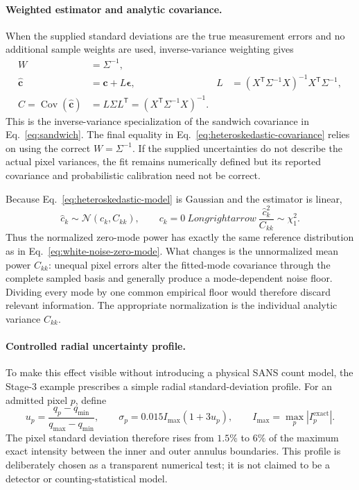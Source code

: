 \documentclass[aps,prb,preprint,onecolumn,notitlepage,amsmath,amssymb,
  superscriptaddress,floatfix]{revtex4-2}
\newcommand{\trans}{\mathsf{T}}
\begin{document}
\paragraph{Weighted estimator and analytic covariance.}
When the supplied standard deviations are the true measurement errors and no
additional sample weights are used, inverse-variance weighting gives
\begin{align}
 W&=\Sigma^{-1},\nonumber\\
 \widehat{\bm c}
 &=\bm c+L\bm\epsilon,
 &L&=(X^{\trans}\Sigma^{-1}X)^{-1}X^{\trans}\Sigma^{-1},
 \label{eq:heteroskedastic-response}\\
 C=\operatorname{Cov}(\widehat{\bm c})
 &=L\Sigma L^{\trans}
 =(X^{\trans}\Sigma^{-1}X)^{-1}.
 \label{eq:heteroskedastic-covariance}
\end{align}
This is the inverse-variance specialization of the sandwich covariance in
Eq.~\eqref{eq:sandwich}.  The final equality in
Eq.~\eqref{eq:heteroskedastic-covariance} relies on using the correct
$W=\Sigma^{-1}$.  If the supplied uncertainties do not describe the actual
pixel variances, the fit remains numerically defined but its reported
covariance and probabilistic calibration need not be correct.

Because Eq.~\eqref{eq:heteroskedastic-model} is Gaussian and the estimator is
linear,
\begin{equation}
 \widehat c_k\sim\mathcal{N}(c_k,C_{kk}),
 \qquad
 c_k=0\ Longrightarrow\
 \frac{\widehat c_k^2}{C_{kk}}\sim\chi_1^2.
 \label{eq:heteroskedastic-zero-mode}
\end{equation}
Thus the normalized zero-mode power has exactly the same reference
distribution as in Eq.~\eqref{eq:white-noise-zero-mode}.  What changes is the
unnormalized mean power $C_{kk}$: unequal pixel errors alter the fitted-mode
covariance through the complete sampled basis and generally produce a
mode-dependent noise floor.  Dividing every mode by one common empirical
floor would therefore discard relevant information.  The appropriate
normalization is the individual analytic variance $C_{kk}$.

\paragraph{Controlled radial uncertainty profile.}
To make this effect visible without introducing a physical SANS count model,
the Stage-3 example prescribes a simple radial standard-deviation profile.
For an admitted pixel $p$, define
\begin{equation}
 u_p=\frac{q_p-q_{\min}}{q_{\max}-q_{\min}},
 \qquad
 \sigma_p=0.015 I_{\max}(1+3u_p),
 \qquad
 I_{\max}=\max_p|I_p^{\mathrm{exact}}|.
 \label{eq:heteroskedastic-profile}
\end{equation}
The pixel standard deviation therefore rises from $1.5\%$ to $6\%$ of the
maximum exact intensity between the inner and outer annulus boundaries.  This
profile is deliberately chosen as a transparent numerical test; it is not
claimed to be a detector or counting-statistical model.
\end{document}
